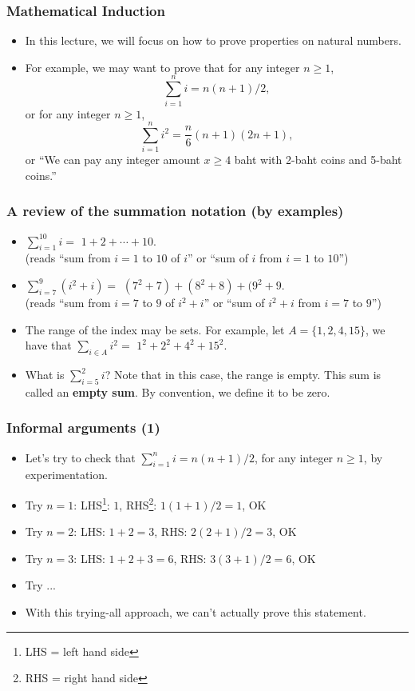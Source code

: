 

\begin{frame}\frametitle{Mathematical Induction}
  \begin{itemize}
  \item In this lecture, we will focus on how to prove properties on natural numbers. \pause
  \item For example, we may want to prove that for any integer $n\geq 1$,
    \[ \sum_{i=1}^n i = n(n+1)/2, \]
    \pause
    or for any integer $n\geq 1$,
    \[ \sum_{i=1}^n i^2 = \frac{n}{6}(n+1)(2n+1),\]
    \pause
    or ``We can pay any integer amount $x\geq 4$ baht with 2-baht
    coins and 5-baht coins.''
  \end{itemize}
\end{frame}

\begin{frame}\frametitle{A review of the summation notation (by examples)}
  \begin{itemize}
  \item $\displaystyle\sum_{i=1}^{10} i =$ \pause $1+2+\cdots+10.$ \\ \pause (reads ``sum from
    $i=1$ to $10$ of $i$'' or ``sum of $i$ from $i=1$ to $10$'') \pause
  \item $\displaystyle\sum_{i=7}^{9} (i^2+i) =$ \pause $(7^2+7)+(8^2+8)+(9^2+9.$ \\ \pause (reads ``sum from $i=7$ to $9$ of $i^2 + i$'' or ``sum of $i^2+i$ from $i=7$ to $9$'') \pause
  \item The range of the index may be sets.  For example, let
    $A=\{1,2,4,15\}$, we have that $\displaystyle\sum_{i\in A} i^2 =$ \pause $1^2+2^2+4^2+15^2$.
    \pause
  \item What is $\sum_{i=5}^{2} i$? \pause Note that in this case, the
    range is empty.  This sum is called an {\bf empty sum}.  By
    convention, we define it to be zero.
  \end{itemize}
\end{frame}

\begin{frame}\frametitle{Informal arguments (1)}
  \begin{itemize}
  \item Let's try to check that $\sum_{i=1}^n i = n(n+1)/2$, for any
    integer $n\geq 1$, by experimentation.
  \item Try $n=1$: \pause LHS\footnote{LHS = left hand side}: $1$, \pause RHS\footnote{RHS = right hand side}: $1(1+1)/2 = 1$, \pause OK
  \item Try $n=2$: \pause LHS: $1+2=3$, \pause RHS: $2(2+1)/2 = 3$, \pause OK
  \item Try $n=3$: \pause LHS: $1+2+3=6$, \pause RHS: $3(3+1)/2 = 6$, \pause OK
  \item Try ... \pause
  \item With this trying-all approach, we can't actually prove this statement.
  \end{itemize}
\end{frame}

